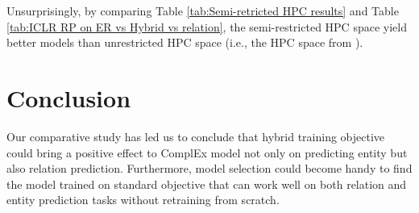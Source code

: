 Unsurprisingly, by comparing Table \ref{tab:Semi-retricted HPC results} and Table \ref{tab:ICLR RP on ER vs Hybrid vs relation}, the semi-restricted HPC space yield better models than unrestricted HPC space (i.e., the HPC space from \cite{Ruffinelli2020You}).



\section{Conclusion}
Our comparative study has led us to conclude that hybrid training objective could bring a positive effect to ComplEx model not only on predicting entity but also relation prediction. Furthermore, model selection could become handy to find the model trained on standard objective that can work well on both relation and entity prediction tasks without retraining from scratch.  



